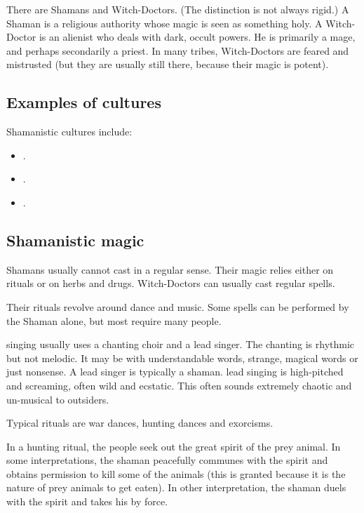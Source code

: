 
There are Shamans and Witch-Doctors. (The distinction is not always rigid.) A Shaman is a religious authority whose magic is seen as something holy. A Witch-Doctor is an alienist who deals with dark, occult powers. He is primarily a mage, and perhaps secondarily a priest. In many tribes, Witch-Doctors are feared and mistrusted (but they are usually still there, because their magic is potent). 









\subsection{Examples of cultures}
Shamanistic cultures include: 

\begin{itemize}
  \item {}. 
  \item {}. 
  \item {}. 
\end{itemize}









\subsection{Shamanistic magic}
Shamans usually cannot cast  in a regular sense. Their magic relies either on rituals or on herbs and drugs. Witch-Doctors can usually cast regular spells. 

Their rituals revolve around dance and music. Some spells can be performed by the Shaman alone, but most require many people. 

\Meccaran{} singing usually uses a chanting choir and a lead singer. The chanting is rhythmic but not melodic. It may be with understandable words, strange, magical words or just nonsense. A lead singer is typically a shaman. \Meccaran{} lead singing is high-pitched and screaming, often wild and ecstatic. This often sounds extremely chaotic and un-musical to outsiders. 

Typical rituals are war dances, hunting dances and exorcisms. 

In a hunting ritual, the people seek out the great spirit of the prey animal. In some interpretations, the shaman peacefully communes with the spirit and obtains permission to kill some of the animals (this is granted because it is the nature of prey animals to get eaten). In other interpretation, the shaman duels with the spirit and takes his  by force. 

